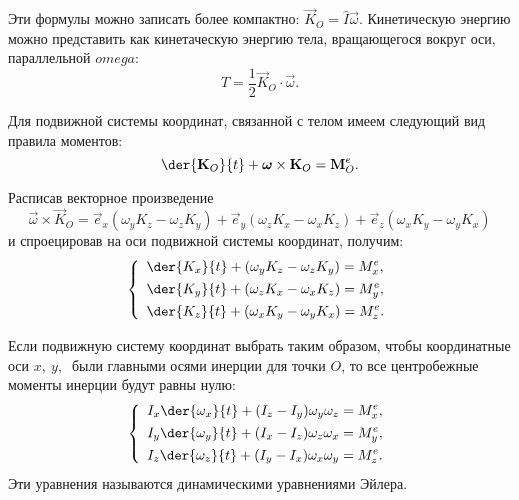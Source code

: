 Эти формулы можно записать более компактно: \( \vec{K}_O = \hat{I}\vec{\omega}
\). Кинетическую энергию можно представить как кинетаческую энергию тела,
вращающегося вокруг оси, параллельной \( omega \):
\[
    T = \frac{1}{2}\vec{K}_O\cdot\vec{\omega}.
\] 

Для подвижной системы координат, связанной с телом имеем следующий вид правила
моментов:
\[
    \der{\vec{K}_O}{t} + \vec{\omega} \times\vec{K}_O = \vec{M}^e_O.
\]

Расписав векторное произведение
\[
    \vec{\omega}\times\vec{K}_O = \vec{e}_x(\omega_y K_z - \omega_z K_y) +
    \vec{e}_y(\omega_z K_x - \omega_x K_z) + \vec{e}_z(\omega_x K_y -
    \omega_y K_x)
\]
и спроецировав на оси подвижной системы координат, получим:
\[
    \left\{ \begin{array}{l}
        \ds \der{K_x}{t} + (\omega_y K_z - \omega_z K_y) = M^e_x, \\[.4em]
        \ds \der{K_y}{t} + (\omega_z K_x - \omega_x K_z) = M^e_y, \\[.4em]
        \ds \der{K_z}{t} + (\omega_x K_y - \omega_y K_x) = M^e_z.
    \end{array} \right.
\]

Если подвижную систему координат выбрать таким образом, чтобы координатные оси
\( x,\ y,\ \) были главными осями инерции для точки \( O \), то все центробежные
моменты инерции будут равны нулю:
\[
    \left\{ \begin{array}{l}
        \ds I_x\der{\omega_x}{t} + (I_z -  I_y)\omega_y\omega_z = M^e_x, \\[.4em]
        \ds I_y\der{\omega_y}{t} + (I_x -  I_z)\omega_z\omega_x = M^e_y, \\[.4em]
        \ds I_z\der{\omega_z}{t} + (I_y -  I_x)\omega_x\omega_y = M^e_z.
    \end{array} \right.
\] 
Эти уравнения называются динамическими уравнениями Эйлера.

\newpage
